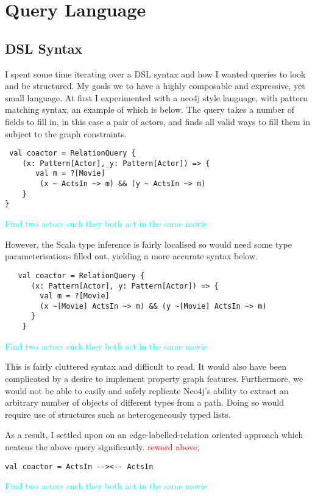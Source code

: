 \documentclass[12pt,a4paper,twoside,openright]{report}
\newcommand\todo[1]{\textcolor{red}{#1}}
\newcommand\note[1]{\textcolor{cyan}{#1}}
\begin{document}
\section{Query Language}
\subsection{DSL Syntax}
I spent some time iterating over a DSL syntax and how I wanted queries to look and be structured. My goals we to have a highly composable and expressive, yet small language. At first I experimented with a neo4j style language, with pattern matching syntax, an example of which is below. The query takes a number of fields to fill in, in this case a pair of actors, and finds all valid ways to fill them in subject to the graph constraints.
\begin{framed}
\begin{verbatim}
 val coactor = RelationQuery {
    (x: Pattern[Actor], y: Pattern[Actor]) => {
       val m = ?[Movie]
        (x ~ ActsIn ~> m) && (y ~ ActsIn ~> m)
    }
}
\end{verbatim}
\note{Find two actors such they both act in the same movie}
\end{framed}
However, the Scala type inference is fairly localised so would need some type parameterisations filled out, yielding a more accurate syntax below.
\begin{framed}
\begin{verbatim}
   val coactor = RelationQuery {
      (x: Pattern[Actor], y: Pattern[Actor]) => {
        val m = ?[Movie]
        (x ~[Movie] ActsIn ~> m) && (y ~[Movie] ActsIn ~> m)
      }
    }
\end{verbatim}
\note{Find two actors such they both act in the same movie}
\end{framed}
This is fairly cluttered syntax and difficult to read. It would also have been complicated by a desire to implement property graph features. Furthermore, we would not be able to easily and safely replicate Neo4j's ability to extract an arbitrary number of objects of different types from a path. Doing so would require use of structures such as heterogeneously typed lists.

As a result, I settled upon on an edge-labelled-relation oriented approach which neatens the above query significantly.
\todo{reword above;}
\begin{framed}
\begin{verbatim}
val coactor = ActsIn --><-- ActsIn
\end{verbatim}
\note{Find two actors such they both act in the same movie}
\end{framed}
\end{document}
